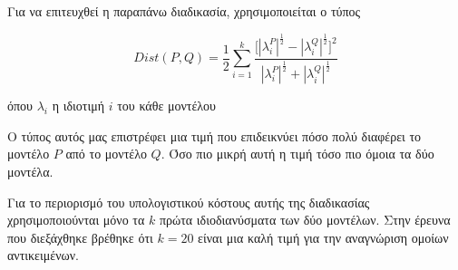 \documentclass[draft]{article}
\begin{document}
Για να επιτευχθεί η παραπάνω διαδικασία, χρησιμοποιείται ο τύπος

\[
	Dist(P, Q) = {
		\frac {1} {2}
		\sum^{k}_{i=1} {
			\frac
			{
				\Big[
					|\lambda^{P}_{i}|^{\frac{1}{2}} - |\lambda^{Q}_{i}|^{\frac{1}{2}}
				\Big]^2
			}
			{
				|\lambda^{P}_{i}|^{\frac{1}{2}} + |\lambda^{Q}_{i}|^{\frac{1}{2}}
			}
		}
	}
\]

όπου $\lambda_{i}$ η ιδιοτιμή $i$ του κάθε μοντέλου

Ο τύπος αυτός μας επιστρέφει μια τιμή που επιδεικνύει πόσο πολύ διαφέρει το μοντέλο
$P$ από το μοντέλο $Q$. Όσο πιο μικρή αυτή η τιμή τόσο πιο όμοια τα δύο μοντέλα.

Για το περιορισμό του υπολογιστικού κόστους αυτής της διαδικασίας χρησιμοποιούνται μόνο
τα $k$ πρώτα ιδιοδιανύσματα των δύο μοντέλων. Στην έρευνα που διεξάχθηκε βρέθηκε ότι
$k=20$ είναι μια καλή τιμή για την αναγνώριση ομοίων αντικειμένων.


\nocite{*}
\printbibliography[
	heading=bibintoc,
	title={References}
]
\end{document}
